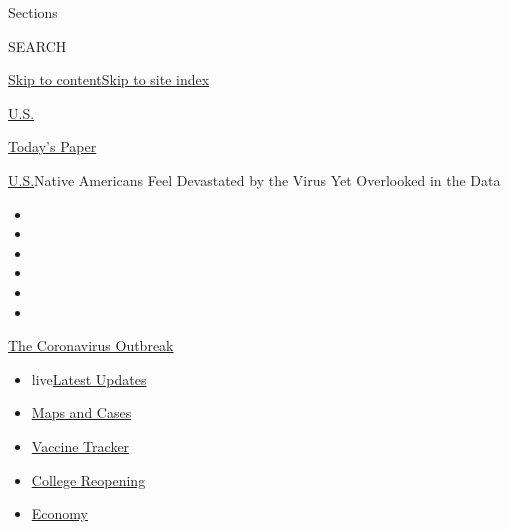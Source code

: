Sections

SEARCH

\protect\hyperlink{site-content}{Skip to
content}\protect\hyperlink{site-index}{Skip to site index}

\href{https://www.nytimes.com/section/us}{U.S.}

\href{https://myaccount.nytimes.com/auth/login?response_type=cookie\&client_id=vi}{}

\href{https://www.nytimes.com/section/todayspaper}{Today's Paper}

\href{/section/us}{U.S.}\textbar{}Native Americans Feel Devastated by
the Virus Yet Overlooked in the Data

\begin{itemize}
\item
\item
\item
\item
\item
\item
\end{itemize}

\href{https://www.nytimes.com/news-event/coronavirus?action=click\&pgtype=Article\&state=default\&region=TOP_BANNER\&context=storylines_menu}{The
Coronavirus Outbreak}

\begin{itemize}
\tightlist
\item
  live\href{https://www.nytimes.com/2020/08/04/world/coronavirus-cases.html?action=click\&pgtype=Article\&state=default\&region=TOP_BANNER\&context=storylines_menu}{Latest
  Updates}
\item
  \href{https://www.nytimes.com/interactive/2020/us/coronavirus-us-cases.html?action=click\&pgtype=Article\&state=default\&region=TOP_BANNER\&context=storylines_menu}{Maps
  and Cases}
\item
  \href{https://www.nytimes.com/interactive/2020/science/coronavirus-vaccine-tracker.html?action=click\&pgtype=Article\&state=default\&region=TOP_BANNER\&context=storylines_menu}{Vaccine
  Tracker}
\item
  \href{https://www.nytimes.com/2020/08/02/us/covid-college-reopening.html?action=click\&pgtype=Article\&state=default\&region=TOP_BANNER\&context=storylines_menu}{College
  Reopening}
\item
  \href{https://www.nytimes.com/live/2020/08/04/business/stock-market-today-coronavirus?action=click\&pgtype=Article\&state=default\&region=TOP_BANNER\&context=storylines_menu}{Economy}
\end{itemize}

